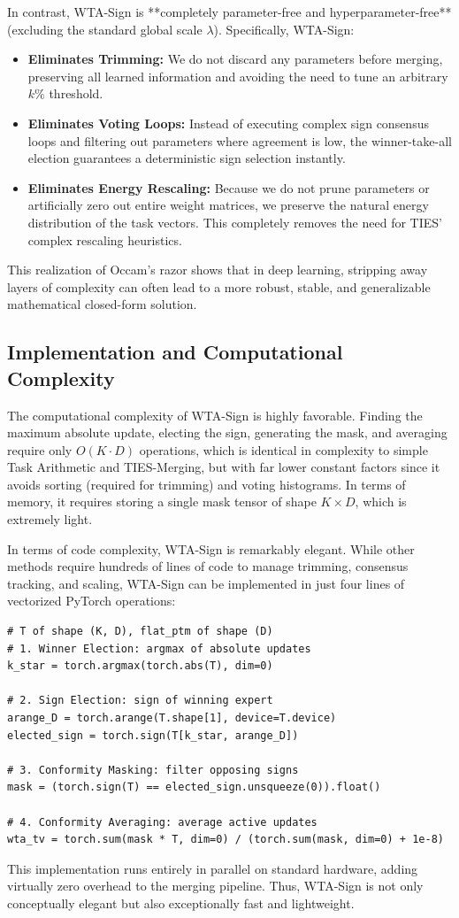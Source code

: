 In contrast, WTA-Sign is **completely parameter-free and hyperparameter-free** (excluding the standard global scale $\lambda$).
Specifically, WTA-Sign:
\begin{itemize}
    \item \textbf{Eliminates Trimming:} We do not discard any parameters before merging, preserving all learned information and avoiding the need to tune an arbitrary $k\%$ threshold.
    \item \textbf{Eliminates Voting Loops:} Instead of executing complex sign consensus loops and filtering out parameters where agreement is low, the winner-take-all election guarantees a deterministic sign selection instantly.
    \item \textbf{Eliminates Energy Rescaling:} Because we do not prune parameters or artificially zero out entire weight matrices, we preserve the natural energy distribution of the task vectors. This completely removes the need for TIES' complex rescaling heuristics.
\end{itemize}
This realization of Occam's razor shows that in deep learning, stripping away layers of complexity can often lead to a more robust, stable, and generalizable mathematical closed-form solution.

\subsection{Implementation and Computational Complexity}
The computational complexity of WTA-Sign is highly favorable.
Finding the maximum absolute update, electing the sign, generating the mask, and averaging require only $O(K \cdot D)$ operations, which is identical in complexity to simple Task Arithmetic and TIES-Merging, but with far lower constant factors since it avoids sorting (required for trimming) and voting histograms.
In terms of memory, it requires storing a single mask tensor of shape $K \times D$, which is extremely light.

In terms of code complexity, WTA-Sign is remarkably elegant.
While other methods require hundreds of lines of code to manage trimming, consensus tracking, and scaling, WTA-Sign can be implemented in just four lines of vectorized PyTorch operations:

\begin{verbatim}
# T of shape (K, D), flat_ptm of shape (D)
# 1. Winner Election: argmax of absolute updates
k_star = torch.argmax(torch.abs(T), dim=0)

# 2. Sign Election: sign of winning expert
arange_D = torch.arange(T.shape[1], device=T.device)
elected_sign = torch.sign(T[k_star, arange_D])

# 3. Conformity Masking: filter opposing signs
mask = (torch.sign(T) == elected_sign.unsqueeze(0)).float()

# 4. Conformity Averaging: average active updates
wta_tv = torch.sum(mask * T, dim=0) / (torch.sum(mask, dim=0) + 1e-8)
\end{verbatim}

This implementation runs entirely in parallel on standard hardware, adding virtually zero overhead to the merging pipeline.
Thus, WTA-Sign is not only conceptually elegant but also exceptionally fast and lightweight.
